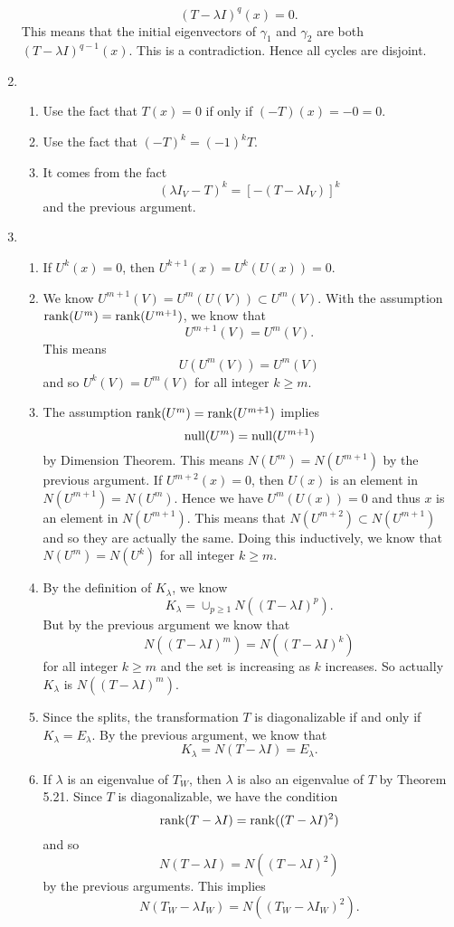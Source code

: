 \begin{enumerate}
\[(T-\lambda I)^q(x)=0.\]
This means that the initial eigenvectors of $\gamma_1$ and $\gamma_2$ are both $(T-\lambda I)^{q-1}(x)$. This is a contradiction. Hence all cycles are disjoint.
\item \begin{enumerate}
\item Use the fact that $T(x)=0$ if only if $(-T)(x)=-0=0$.
\item Use the fact that $(-T)^k=(-1)^kT$.
\item It comes from the fact 
\[(\lambda I_V-T)^k=[-(T-\lambda I_V)]^k\] 
and the previous argument.
\end{enumerate}
\item \begin{enumerate}
\item If $U^k(x)=0$, then $U^{k+1}(x)=U^k(U(x))=0$.
\item We know $U^{m+1}(V)=U^m(U(V))\subset U^m(V)$. With the assumption $\operatorname{rank}(U^m)=\operatorname{rank}(U^{m+1})$, we know that 
\[U^{m+1}(V)=U^m(V).\]
This means 
\[U(U^m(V))=U^m(V)\]
and so $U^k(V)=U^m(V)$ for all integer $k\geq m$.
\item The assumption $\operatorname{rank}(U^m)=\operatorname{rank}(U^{m+1})$ implies 
\[\operatorname{null}(U^m)=\operatorname{null}(U^{m+1})\]
by Dimension Theorem. This means $N(U^m)=N(U^{m+1})$ by the previous argument. If $U^{m+2}(x)=0$, then $U(x)$ is an element in $N(U^{m+1})=N(U^m)$. Hence we have $U^m(U(x))=0$ and thus $x$ is an element in $N(U^{m+1})$. This means that $N(U^{m+2})\subset N(U^{m+1})$ and so they are actually the same. Doing this inductively, we know that $N(U^m)=N(U^k)$ for all integer $k\geq m$.
\item By the definition of $K_{\lambda}$, we know 
\[K_{\lambda}=\cup_{p\geq 1}N((T-\lambda I)^p).\]
But by the previous argument we know that 
\[N((T-\lambda I)^m)=N((T-\lambda I)^k)\]
for all integer $k\geq m$ and the set is increasing as $k$ increases. So actually $K_{\lambda}$ is $N((T-\lambda I)^m)$.
\item Since the \charpoly{} splits, the transformation $T$ is diagonalizable if and only if $K_{\lambda}=E_{\lambda}$. By the previous argument, we know that 
\[K_{\lambda}=N(T-\lambda I)=E_{\lambda}.\]
\item If $\lambda $ is an eigenvalue of $T_W$, then $\lambda $ is also an eigenvalue of $T$ by Theorem 5.21. Since $T$ is diagonalizable, we have the condition 
\[\operatorname{rank}(T-\lambda I)=\operatorname{rank}((T-\lambda I)^2)\]
and so 
\[N(T-\lambda I)=N((T-\lambda I)^2)\]
by the previous arguments. This implies 
\[N(T_W-\lambda I_W)=N((T_W-\lambda I_W)^2).\]

\end{enumerate}
\end{enumerate}
